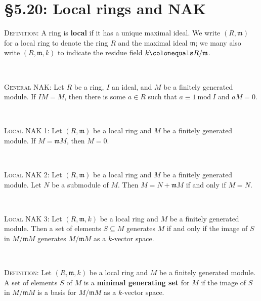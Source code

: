\documentclass[12pt]{amsart}
\newcommand{\m}{\mathfrak{m}}
\newcommand{\1}{\mathbbm{1}}
\newcommand{\showsol}[1]{\def\displaysol{#1}}
\newcommand\ceq{\colonequals}
\begin{document}
\showsol{0}
	
	\thispagestyle{empty}
	
	\section*{\S5.20: Local rings and NAK}	

\begin{framed}




\noindent \textsc{Definition:} A ring is \textbf{local} if it has a unique maximal ideal. We write $(R,\m)$ for a local ring to denote the ring $R$ and the maximal ideal $\m$; we many also write $(R,\m,k)$ to indicate the residue field $k\ceq R/\m$.


\

\noindent \textsc{General NAK:} Let $R$ be a ring, $I$ an ideal, and $M$ be a finitely generated module. If $IM=M$, then there is some $a\in R$ such that $a\equiv 1 \ \mathrm{mod} \ I$ and  $aM=0$.

\

\noindent \textsc{Local NAK 1:} Let $(R,\m)$ be a local ring and $M$ be a finitely generated module. If $M=\m M$, then $M=0$.

\

\noindent \textsc{Local NAK 2:} Let $(R,\m)$ be a local ring and $M$ be a finitely generated module. Let $N$ be a submodule of $M$. Then $M = N + \m M$ if and only if $M=N$.

\

\noindent \textsc{Local NAK 3:} Let $(R,\m,k)$ be a local ring and $M$ be a finitely generated module. Then a set of elements $S\subseteq M$ generates $M$ if and only if the image of $S$ in $M/\m M$ generates $M/\m M$ as a $k$-vector space.


\

\noindent \textsc{Definition:} Let $(R,\m,k)$ be a local ring and $M$ be a finitely generated module. A set of elements $S$ of $M$ is a \textbf{minimal generating set} for $M$ if the image of $S$ in $M/\m M$ is a basis for $M/\m M$ as a $k$-vector space.
\end{framed}
\end{document}
